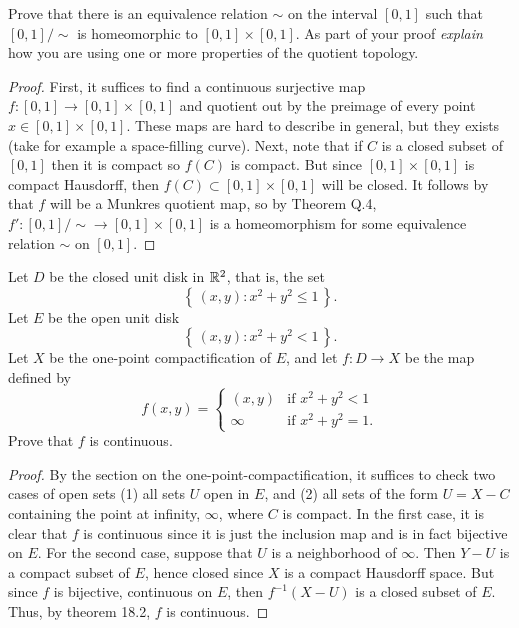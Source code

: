 \begin{problem}
Prove that there is an equivalence relation $\sim$ on the interval $[0,1]$
such that $[0,1]/{\sim}$ is homeomorphic to $[0,1]\times[0,1]$. As part of
your proof \emph{explain} how you are using one or more properties of the
quotient topology.
\end{problem}
\begin{proof}
First, it suffices to find a continuous surjective map $f\colon[0,1]\to
[0,1]\times[0,1]$ and quotient out by the preimage of every point
$x\in[0,1]\times[0,1]$. These maps are hard to describe in general, but
they exists (take for example a space-filling curve). Next, note that if
$C$ is a closed subset of $[0,1]$ then it is compact so $f(C)$ is
compact. But since $[0,1]\times[0,1]$ is compact Hausdorff, then
$f(C)\subset[0,1]\times[0,1]$ will be closed. It follows by that $f$ will
be a Munkres quotient map, so by Theorem Q.4, $f'\colon
[0,1]/{\sim}\to[0,1]\times[0,1]$ is a homeomorphism for some equivalence
relation $\sim$ on $[0,1]$.
\end{proof}

\begin{problem}
Let $D$ be the closed unit disk in $\mathbb{R}^2$, that is, the set
\[
\left\{\,(x,y):x^2+y^2\leq 1\,\right\}.
\]
Let $E$ be the open unit disk
\[
\left\{\,(x,y):x^2+y^2<1\,\right\}.
\]
Let $X$ be the one-point compactification of $E$, and let $f\colon D\to X$
be the map defined by
\[
f(x,y)=
\begin{cases}
(x,y)&\text{if $x^2+y^2<1$}\\
\infty&\text{if $x^2+y^2=1$.}
\end{cases}
\]
Prove that $f$ is continuous.
\end{problem}
\begin{proof}
By the section on the one-point-compactification, it suffices to check two
cases of open sets (1) all sets $U$ open in $E$, and (2) all sets of the
form $U=X-C$ containing the point at infinity, $\infty$, where $C$ is
compact. In the first case, it is clear that $f$ is continuous since it is
just the inclusion map and is in fact bijective on $E$. For the second
case, suppose that $U$ is a neighborhood of $\infty$. Then $Y-U$ is a
compact subset of $E$, hence closed since $X$ is a compact Hausdorff
space. But since $f$ is bijective, continuous on $E$, then $f^{-1}(X-U)$ is
a closed subset of $E$. Thus, by theorem 18.2, $f$ is continuous.
\end{proof}

